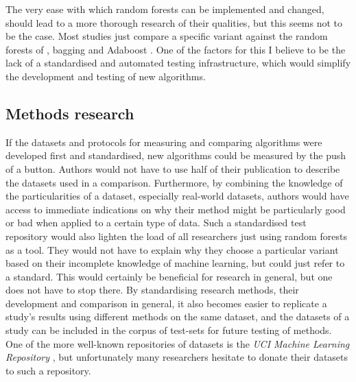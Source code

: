 \documentclass[a4paper,man,12pt,apacite,floatsintext]{apa6} %
\begin{document}
The very ease with which random forests can be implemented and changed,
should lead to a more thorough research of their qualities,
but this seems not to be the case.
Most studies just compare a specific variant against the random forests
of , bagging \cite{breiman1996bagging}
and Adaboost \cite{freund1995decision}.
One of the factors for this I believe to be the lack of a standardised
and automated testing infrastructure, which would simplify the development
and testing of new algorithms.

\subsection{Methods research}
If the datasets and protocols for measuring and comparing algorithms were
developed first and standardised, new algorithms could be measured by the
push of a button.
Authors would not have to use half of their publication
to describe the datasets used in a comparison.
Furthermore, by combining the knowledge of the particularities of a dataset,
especially real-world datasets, authors would have access to immediate
indications on why their method might be particularly good or bad when applied
to a certain type of data.
Such a standardised test repository would also lighten the load of all
researchers just using random forests as a tool.
They would not have to explain why they choose a particular variant based on
their incomplete knowledge of machine learning, but could just refer to
a standard.
This would certainly be beneficial for research in general, but one does not have
to stop there.
By standardising research methods, their development and comparison
in general, it also becomes easier to replicate a study's results using
different methods on the same dataset, and the datasets of a study can
be included in the corpus of test-sets for future testing of methods.
One of the more well-known repositories of datasets is the \emph{UCI Machine Learning Repository}
\cite{UCIrepo}, but unfortunately many researchers hesitate to donate their
datasets to such a repository.
\end{document}
